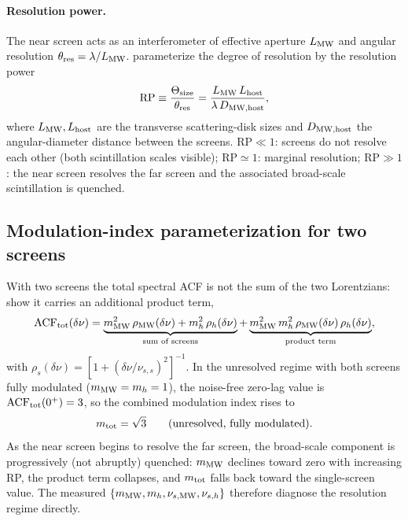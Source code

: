 \paragraph{Resolution power.}
The near screen acts as an interferometer of effective aperture $L_{\rm MW}$
and angular resolution $\theta_{\rm res}=\lambda/L_{\rm MW}$.
\citet{Pradeep2025} parameterize the degree of resolution by the resolution
power
%
\begin{equation}
\mathrm{RP} \equiv \frac{\Theta_{\rm size}}{\theta_{\rm res}}
  = \frac{L_{\rm MW}\,L_{\rm host}}{\lambda\,D_{\rm MW,host}},
\label{eq:rp}
\end{equation}
%
where $L_{\rm MW},L_{\rm host}$ are the transverse scattering-disk sizes and
$D_{\rm MW,host}$ the angular-diameter distance between the screens.
$\mathrm{RP}\ll1$: screens do not resolve each other (both scintillation
scales visible); $\mathrm{RP}\simeq1$: marginal resolution; $\mathrm{RP}\gg1$:
the near screen resolves the far screen and the associated broad-scale
scintillation is quenched.

\subsection{Modulation-index parameterization for two screens}
\label{app:modindex}

With two screens the total spectral ACF is not the sum of the two Lorentzians:
\citet{Pradeep2025} show it carries an additional product term,
%
\begin{equation}
\mathrm{ACF}_{\rm tot}(\delta\nu)
  = \underbrace{m_{\rm MW}^{2}\,\rho_{\rm MW}(\delta\nu)
  + m_{h}^{2}\,\rho_{h}(\delta\nu)}_{\text{sum of screens}}
  + \underbrace{m_{\rm MW}^{2}\,m_{h}^{2}\,
      \rho_{\rm MW}(\delta\nu)\,\rho_{h}(\delta\nu)}_{\text{product term}},
\label{eq:acf2}
\end{equation}
%
with $\rho_{s}(\delta\nu)=[1+(\delta\nu/\nu_{s,s})^{2}]^{-1}$. In the
unresolved regime with both screens fully modulated
($m_{\rm MW}=m_{h}=1$), the noise-free zero-lag value is
$\mathrm{ACF}_{\rm tot}(0^{+})=3$, so the combined modulation index rises to
%
\begin{equation}
m_{\rm tot} = \sqrt{3}\qquad(\text{unresolved, fully modulated}).
\label{eq:sqrt3}
\end{equation}
%
As the near screen begins to resolve the far screen, the broad-scale component
is progressively (not abruptly) quenched: $m_{\rm MW}$ declines toward zero
with increasing RP, the product term collapses, and $m_{\rm tot}$ falls back
toward the single-screen value. The measured
$\{m_{\rm MW},m_{h},\nu_{s,\rm MW},\nu_{s,h}\}$ therefore diagnose the
resolution regime directly.

